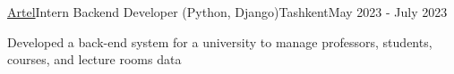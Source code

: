 \begin{resume_employer}{\href{https://www.linkedin.com/company/artelelectronics/}{Artel}}{Intern Backend Developer (Python, Django)}{Tashkent}{May 2023 - July 2023}
  \item Developed a back-end system for a university to manage  professors, students, courses, and lecture rooms data
 \end{resume_employer}
